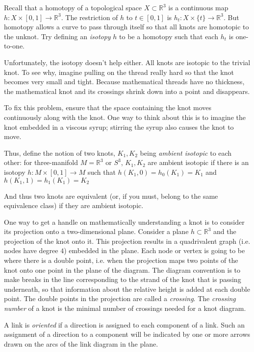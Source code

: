 \documentclass[a4paper,titlepage,twoside]{book}
\begin{document}
Recall that a homotopy of a topological space $X \subset \mathbb{R}^3$ is a continuous map $h: X \times [0,1] \to \mathbb{R}^3$. The restriction of $h$ to $t \in [0,1]$ is $h_t:X\times \lbrace t \rbrace \to \mathbb{R}^3$.  But homotopy allows a curve to pass through itself so that all knots are homotopic to the unknot. Try defining an \emph{isotopy} $h$ to be a homotopy such that each $h_t$ is one-to-one.  

Unfortunately, the isotopy doesn't help either. All knots are isotopic to the trivial knot. To see why, imagine pulling on the thread really hard so that the knot becomes very small and tight. Because mathematical threads have no thickness, the mathematical knot and its crossings shrink down into a point and disappears.  

To fix this problem, ensure that the space containing the knot moves continuously along with the knot.  One way to think about this is to imagine the knot embedded in a viscous syrup; stirring the syrup also causes the knot to move.  

Thus, define the notion of two knots, $K_1,K_2$ being \emph{ambient isotopic} to each other: for three-manifold $M = \mathbb{R}^3$ or $S^3$, $K_1, K_2$ are ambient isotopic if there is an isotopy $h: M \times [0,1] \to M$ such that $h(K_1, 0) = h_0(K_1) = K_1$ and $h(K_1,1) = h_1(K_1) = K_2$

And thus two knots are equivalent (or, if you must, belong to the same equivalence class) if they are ambient isotopic.  

One way to get a handle on mathematically understanding a knot is to consider its projection onto a two-dimensional plane.   Consider a plane $h \subset \mathbb{R}^3$ and the projection of the knot onto it. This projection results in a quadrivalent graph (i.e. nodes have degree $4$) embedded in the plane. Each node or vertex is going to be where there is a double point, i.e. when the projection maps two points of the knot onto one point in the plane of the diagram.  The diagram convention is to make breaks in the line corresponding to the strand of the knot that is passing underneath, so that information about the relative height is added at each double point.  The double points in the projection are called a \emph{crossing}.  The \emph{crossing number} of a knot is the minimal number of crossings needed for a knot diagram. 

A link is \emph{oriented} if a direction is assigned to each component of a link.  Such an assignment of a direction to a component will be indicated by one or more arrows drawn on the arcs of the link diagram in the plane.  
\end{document}
